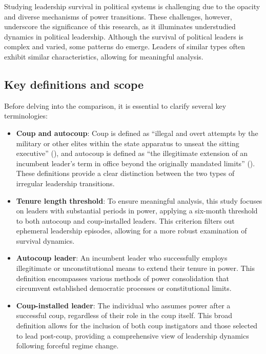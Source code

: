 \documentclass[
  12pt,
]{article}
\begin{document}
Studying leadership survival in political systems is challenging due to
the opacity and diverse mechanisms of power transitions. These
challenges, however, underscore the significance of this research, as it
illuminates understudied dynamics in political leadership. Although the
survival of political leaders is complex and varied, some patterns do
emerge. Leaders of similar types often exhibit similar characteristics,
allowing for meaningful analysis.

\subsection{Key definitions and scope}\label{key-definitions-and-scope}

Before delving into the comparison, it is essential to clarify several
key terminologies:

\begin{itemize}
\item
  \textbf{Coup and autocoup}: Coup is defined as ``illegal and overt
  attempts by the military or other elites within the state apparatus to
  unseat the sitting executive'' (), and autocoup is defined as ``the illegitimate extension
  of an incumbent leader's term in office beyond the originally mandated
  limits'' (). These definitions provide
  a clear distinction between the two types of irregular leadership
  transitions.
\item
  \textbf{Tenure length threshold}: To ensure meaningful analysis, this
  study focuses on leaders with substantial periods in power, applying a
  six-month threshold to both autocoup and coup-installed leaders. This
  criterion filters out ephemeral leadership episodes, allowing for a
  more robust examination of survival dynamics.
\item
  \textbf{Autocoup leader}: An incumbent leader who successfully employs
  illegitimate or unconstitutional means to extend their tenure in
  power. This definition encompasses various methods of power
  consolidation that circumvent established democratic processes or
  constitutional limits.
\item
  \textbf{Coup-installed leader}: The individual who assumes power after
  a successful coup, regardless of their role in the coup itself. This
  broad definition allows for the inclusion of both coup instigators and
  those selected to lead post-coup, providing a comprehensive view of
  leadership dynamics following forceful regime change.
\end{itemize}
\end{document}
